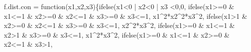 \documentclass[
  letterpaper,
  DIV=11,
  numbers=noendperiod]{scrreprt}
\newenvironment{Shaded}{\begin{snugshade}}{\end{snugshade}}
\newcommand{\ControlFlowTok}[1]{\textcolor[rgb]{0.00,0.23,0.31}{#1}}
\newcommand{\DecValTok}[1]{\textcolor[rgb]{0.68,0.00,0.00}{#1}}
\newcommand{\FunctionTok}[1]{\textcolor[rgb]{0.28,0.35,0.67}{#1}}
\newcommand{\NormalTok}[1]{\textcolor[rgb]{0.00,0.23,0.31}{#1}}
\newcommand{\OtherTok}[1]{\textcolor[rgb]{0.00,0.23,0.31}{#1}}
\newcommand{\SpecialCharTok}[1]{\textcolor[rgb]{0.37,0.37,0.37}{#1}}
\begin{document}
\begin{Shaded}
\begin{Highlighting}[]
\NormalTok{f.dist.con }\OtherTok{=} \ControlFlowTok{function}\NormalTok{(x1,x2,x3)\{}\FunctionTok{ifelse}\NormalTok{(x1}\SpecialCharTok{\textless{}}\DecValTok{0} \SpecialCharTok{|}\NormalTok{ x2}\SpecialCharTok{\textless{}}\DecValTok{0} \SpecialCharTok{|}\NormalTok{ x3 }\SpecialCharTok{\textless{}}\DecValTok{0}\NormalTok{,}\DecValTok{0}\NormalTok{,}
          \FunctionTok{ifelse}\NormalTok{(x1}\SpecialCharTok{\textgreater{}=}\DecValTok{0} \SpecialCharTok{\&}\NormalTok{ x1}\SpecialCharTok{\textless{}=}\DecValTok{1} \SpecialCharTok{\&}\NormalTok{ x2}\SpecialCharTok{\textgreater{}=}\DecValTok{0} \SpecialCharTok{\&}\NormalTok{ x2}\SpecialCharTok{\textless{}=}\DecValTok{1} \SpecialCharTok{\&}\NormalTok{ x3}\SpecialCharTok{\textgreater{}=}\DecValTok{0} \SpecialCharTok{\&}\NormalTok{ x3}\SpecialCharTok{\textless{}=}\DecValTok{1}\NormalTok{,}
\NormalTok{                 x1}\SpecialCharTok{\^{}}\DecValTok{2}\SpecialCharTok{*}\NormalTok{x2}\SpecialCharTok{\^{}}\DecValTok{2}\SpecialCharTok{*}\NormalTok{x3}\SpecialCharTok{\^{}}\DecValTok{2}\NormalTok{,}
          \FunctionTok{ifelse}\NormalTok{(x1}\SpecialCharTok{\textgreater{}}\DecValTok{1} \SpecialCharTok{\&}\NormalTok{ x2}\SpecialCharTok{\textgreater{}=}\DecValTok{0} \SpecialCharTok{\&}\NormalTok{ x2}\SpecialCharTok{\textless{}=}\DecValTok{1} \SpecialCharTok{\&}\NormalTok{ x3}\SpecialCharTok{\textgreater{}=}\DecValTok{0} \SpecialCharTok{\&}\NormalTok{ x3}\SpecialCharTok{\textless{}=}\DecValTok{1}\NormalTok{,}
\NormalTok{                 x2}\SpecialCharTok{\^{}}\DecValTok{2}\SpecialCharTok{*}\NormalTok{x3}\SpecialCharTok{\^{}}\DecValTok{2}\NormalTok{,}
          \FunctionTok{ifelse}\NormalTok{(x1}\SpecialCharTok{\textgreater{}=}\DecValTok{0} \SpecialCharTok{\&}\NormalTok{ x1}\SpecialCharTok{\textless{}=}\DecValTok{1} \SpecialCharTok{\&}\NormalTok{ x2}\SpecialCharTok{\textgreater{}}\DecValTok{1} \SpecialCharTok{\&}\NormalTok{ x3}\SpecialCharTok{\textgreater{}=}\DecValTok{0} \SpecialCharTok{\&}\NormalTok{ x3}\SpecialCharTok{\textless{}=}\DecValTok{1}\NormalTok{,}
\NormalTok{                 x1}\SpecialCharTok{\^{}}\DecValTok{2}\SpecialCharTok{*}\NormalTok{x3}\SpecialCharTok{\^{}}\DecValTok{2}\NormalTok{,}
          \FunctionTok{ifelse}\NormalTok{(x1}\SpecialCharTok{\textgreater{}=}\DecValTok{0} \SpecialCharTok{\&}\NormalTok{ x1}\SpecialCharTok{\textless{}=}\DecValTok{1} \SpecialCharTok{\&}\NormalTok{ x2}\SpecialCharTok{\textgreater{}=}\DecValTok{0} \SpecialCharTok{\&}\NormalTok{ x2}\SpecialCharTok{\textless{}=}\DecValTok{1} \SpecialCharTok{\&}\NormalTok{ x3}\SpecialCharTok{\textgreater{}}\DecValTok{1}\NormalTok{,}

\end{Highlighting}
\end{Shaded}
\end{document}
